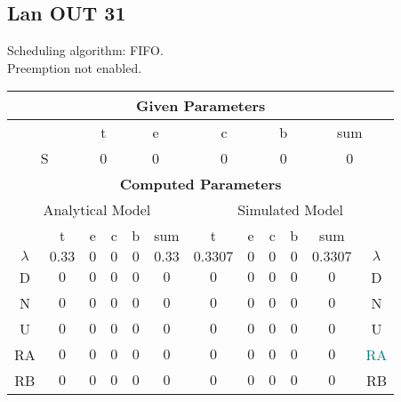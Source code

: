 \documentclass{article}
\begin{document}
\subsection{Lan OUT 31}
Scheduling algorithm: FIFO.\\Preemption not enabled. \\\begin{table}[H]\centering\begin{tabular}{@{}c|cccc|c||cccc|c|c@{}}\toprule\multicolumn{12}{c}{\textbf{Given Parameters}}\\\midrule\multicolumn{2}{c|}{ } & \multicolumn{2}{c}{t} & \multicolumn{2}{c}{e} & \multicolumn{2}{c}{c} & \multicolumn{2}{c}{b} & \multicolumn{2}{|c}{sum} \\ \midrule\multicolumn{2}{c|}{S} & \multicolumn{2}{c}{0} & \multicolumn{2}{c}{0} & \multicolumn{2}{c}{0} & \multicolumn{2}{c}{0} & \multicolumn{2}{|c}{0}\\ \midrule\midrule\multicolumn{12}{c}{\textbf{Computed Parameters}}\\ \midrule\multicolumn{6}{c||}{Analytical Model} & \multicolumn{6}{c}{Simulated Model}\\ 
 \midrule & t & e & c & b & sum & t & e & c & b & sum &  \\ \midrule$\lambda$ &$0.33$ & $0$ & $0$ & $0$ & $0.33$ & $0.3307$ & $0$ & $0$ & $0$ & $0.3307$& $\lambda$ \\D & $0$ & $0$ & $0$ & $0$ & $0$ & $0$ & $0$ & $0$ & $0$ & $0$& D\\N & $0$ & $0$ & $0$ & $0$ & $0$ & $0$ & $0$ & $0$ & $0$ & $0$& N\\U & $0$ & $0$ & $0$ & $0$ & $0$ & $0$ & $0$ & $0$ & $0$ & $0$& U\\RA & $0$ & $0$ & $0$ & $0$ & $0$ & $0$ & $0$ & $0$ & $0$ & $0$& \textcolor{teal}{RA}\\RB & $0$ & $0$ & $0$ & $0$ & $0$ & $0$ & $0$ & $0$ & $0$ & $0$& RB\\
\bottomrule
\end{tabular}
\end{table}
\filbreak
\end{document}

